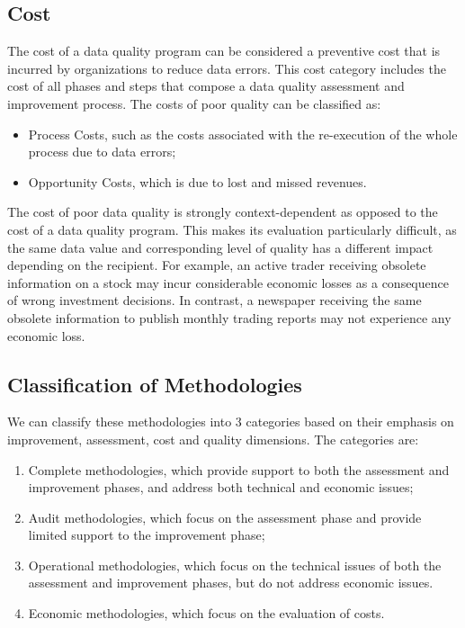 \documentclass[pdftex,english,oribibl]{llncs}
\begin{document}
\subsection{Cost}
The cost of a data quality program can be considered a preventive cost that is incurred by organizations to reduce data errors. This cost category includes the cost of all phases and steps that compose a data quality assessment and improvement process.
 The costs of poor quality can be classified as:
\begin{itemize}
    \item Process Costs, such as the costs associated with the re-execution of the whole process due to data errors;
    \item Opportunity Costs, which is due to lost and missed revenues.
\end{itemize}
 The cost of poor data quality is strongly context-dependent as opposed to the cost of a data quality program. This makes its evaluation particularly difficult, as the same data value and corresponding level of quality has a different impact depending on the recipient. For example, an active trader receiving obsolete information on a stock may incur considerable economic losses as a consequence of wrong investment decisions. In contrast, a newspaper receiving the same obsolete information to publish monthly trading reports may not experience any economic loss.

\subsection{Classification of Methodologies}
We can classify these methodologies into 3 categories based on their emphasis on improvement, assessment, cost and quality dimensions.  The categories are:
\begin{enumerate}
    \item Complete methodologies, which provide support to both the assessment and improvement phases, and address both technical and economic issues;
    \item Audit methodologies, which focus on the assessment phase and provide limited support to the improvement phase;
    \item Operational methodologies, which focus on the technical issues of both the assessment and improvement phases, but do not address economic issues.
    \item Economic methodologies, which focus on the evaluation of costs.
\end{enumerate}
\end{document}

